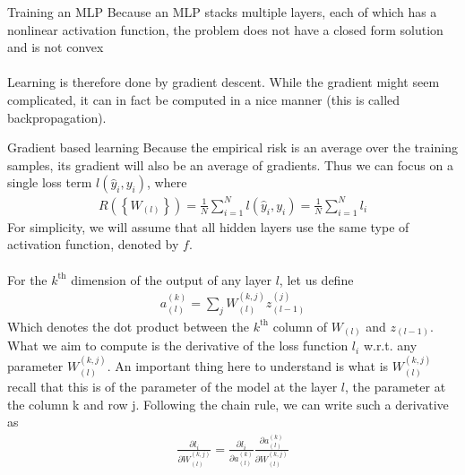 \begin{parag}{Training an MLP}
    Because an MLP stacks multiple layers, each of which has a nonlinear activation function, the problem does not have a closed form solution and is not convex\\
	$ $\\
	Learning is therefore done by gradient descent. While the gradient might seem complicated, it can in fact be computed in a nice manner (this is called backpropagation).
\end{parag}

\begin{parag}{Gradient based learning}
    Because the empirical risk is an average over the training samples, its gradient will also be an average of gradients. Thus we can focus on a single loss term $l\left(\hat{y}_i , y_i\right)$, where 
	\begin{align*} 
		R\left(\left\{W_{\left(l\right)}\right\}\right) = \frac{1}{N}\sum_{i= 1}^{N}l\left(\hat{y}_i, y_i\right)= \frac{1}{N}\sum_{i= 1}^{N}l_i
	\end{align*}
	For simplicity, we will assume that all hidden layers use the same type of activation function, denoted by $f$.\\
	$ $\\
	For the $k^{\text{th}}$ dimension of the output of any layer $l$, let us define 
	\begin{align*} 
		a_{\left(l\right)}^{\left(k\right)} =  \sum_{j} W_{\left(l\right)}^{\left(k, j\right)} z_{\left(l - 1\right)}^{\left(j\right)}
	\end{align*}
	Which denotes the dot product between the $k^{\text{th}}$ column of $W_{\left(l\right)}$ and $z_{\left(l-1\right)}$. What we aim to compute is the derivative of the loss function $l_i$ w.r.t. any parameter $W_{\left(l\right)}^{\left(k, j\right)}$. An important thing here to understand is what is $W_{\left(l\right)}^{\left(k, j\right)}$ recall that this is of the parameter of the model at the layer $l$, the parameter at the column k and row j. Following the chain rule, we can write such a derivative as 
	\begin{align*} 
		\frac{\partial l_i}{\partial W_{\left(l\right)}^{\left(k, j\right)}} = \frac{\partial l_i}{\partial a_{\left(l\right)}^{\left(k\right)}}  \frac{\partial a_{\left(l\right)}^{\left(k\right)}}{\partial W_{\left(l\right)}^{\left(k, j\right)}} 
	\end{align*}



\end{parag}
